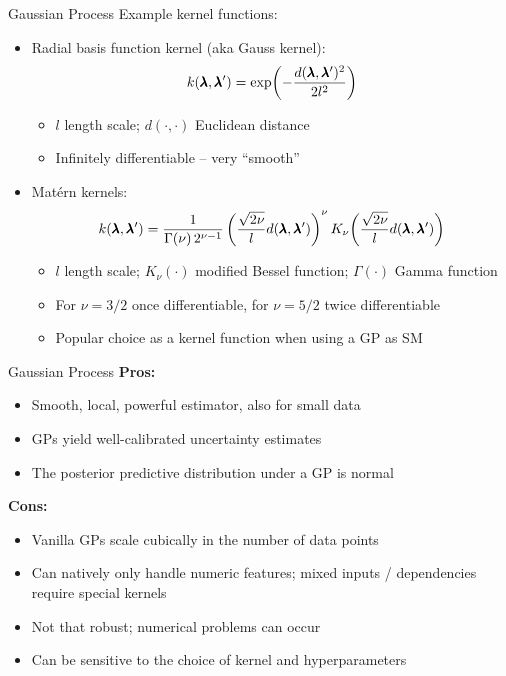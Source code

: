 \documentclass[main]{subfiles}
\begin{document}

\begin{frame}{Gaussian Process}
    \small
    Example kernel functions:
    \begin{itemize}
        \item Radial basis function kernel (aka Gauss kernel):
        $$k(\pmb{\lambda}, \pmb{\lambda}') = \exp\!\left(-\frac{d(\pmb{\lambda}, \pmb{\lambda}')^2}{2 l^2}\right)$$
        \begin{itemize}
            \item $l$ length scale; $d(\cdot, \cdot)$ Euclidean distance
            \item Infinitely differentiable -- very ``smooth''
        \end{itemize}
        \item Matérn kernels:
        $$k(\pmb{\lambda}, \pmb{\lambda}') = \frac{1}{\Gamma(\nu)\, 2^{\nu-1}}\left(\frac{\sqrt{2\nu}}{l} d(\pmb{\lambda}, \pmb{\lambda}')\right)^\nu K_\nu\!\left(\frac{\sqrt{2\nu}}{l} d(\pmb{\lambda}, \pmb{\lambda}')\right)$$
        \begin{itemize}
            \item $l$ length scale; $K_\nu(\cdot)$ modified Bessel function; $\Gamma(\cdot)$ Gamma function
            \item For $\nu = 3/2$ once differentiable, for $\nu = 5/2$ twice differentiable
            \item Popular choice as a kernel function when using a GP as SM
        \end{itemize}
    \end{itemize}
\end{frame}


\begin{frame}{Gaussian Process}
    \textbf{Pros:}
    \begin{itemize}
        \item Smooth, local, powerful estimator, also for small data
        \item GPs yield well-calibrated uncertainty estimates
        \item The posterior predictive distribution under a GP is normal
    \end{itemize}
    \textbf{Cons:}
    \begin{itemize}
        \item Vanilla GPs scale cubically in the number of data points
        \item Can natively only handle numeric features; mixed inputs / dependencies require special kernels
        \item Not that robust; numerical problems can occur
        \item Can be sensitive to the choice of kernel and hyperparameters
    \end{itemize}
\end{frame}
\end{document}
